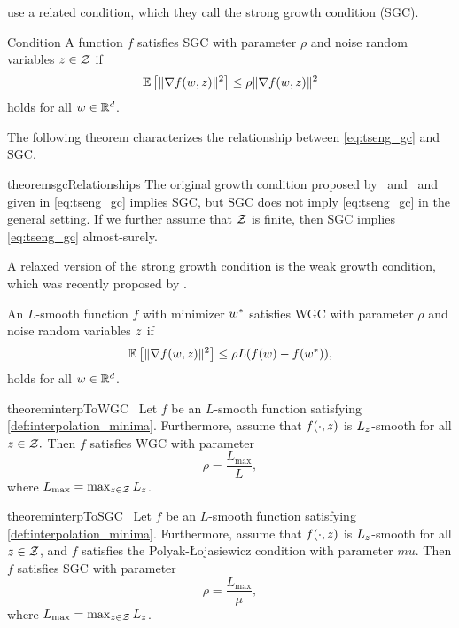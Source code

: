 \citet{vaswani2019fast} use a related condition, which they call the strong growth condition (SGC).
\begin{definition} Condition\label{def:strong_growth}
    A function \(f\) satisfies SGC with parameter \(\rho \) and noise random variables \(z \in \mathcal{Z} \) if
    \[ \mathbb{E}\left[\|\nabla f(w, z)\|^2\right] \leq \rho \|\nabla f(w, z)\|^2 \]
    holds for all \(w \in \mathbb{R}^d\).
\end{definition}

The following theorem characterizes the relationship between \autoref{eq:tseng_gc} and SGC.

\begin{restatable}{theorem}{sgcRelationships}\label{thm:sgc_relationships}
    The original growth condition proposed by~\citet{solodov1998incremental} and~\citet{tseng1998incremental} and given in \autoref{eq:tseng_gc} implies SGC, but
    SGC does not imply \autoref{eq:tseng_gc} in the general setting.
    If we further assume that \( \mathcal{Z} \) is finite, then SGC implies \autoref{eq:tseng_gc} almost-surely.
\end{restatable} 


A relaxed version of the strong growth condition is the weak growth condition, which was recently proposed by \citet{vaswani2019fast}.

\begin{definition}\label{def:weak_growth}
    An \(L\)-smooth function \(f\) with minimizer \(w^* \) satisfies WGC with parameter \(\rho \) and noise random variables \( z \) if
    \[ \mathbb{E}\left[\|\nabla f(w, z)\|^2\right] \leq \rho L (f(w) - f(w^*)), \]
    holds for all \(w \in \mathbb{R}^d\).
\end{definition}


\begin{restatable}{theorem}{interpToWGC}~\label{thm:interp_to_wgc}
    Let \( f \) be an \( L \)-smooth function satisfying \autoref{def:interpolation_minima}.
    Furthermore, assume that \( f(\cdot, z) \) is \( L_z \)-smooth for all \( z \in \mathcal{Z}. \)
    Then \( f \) satisfies WGC with parameter
    \[ \rho = \frac{L_{\text{max}}}{L}, \]
    where \( L_{\text{max}} = \max_{z \in \mathcal{Z}} L_z \).
\end{restatable}


\begin{restatable}{theorem}{interpToSGC}~\label{thm:interp_to_sgc}
    Let \( f \) be an \( L \)-smooth function satisfying \autoref{def:interpolation_minima}.
    Furthermore, assume that \( f(\cdot, z) \) is \( L_z \)-smooth for all \( z \in \mathcal{Z} \),
    and \( f \) satisfies the Polyak-Łojasiewicz condition with parameter \( mu \).
    Then \( f \) satisfies SGC with parameter
    \[ \rho = \frac{L_{\text{max}}}{\mu}, \]
    where \( L_{\text{max}} = \max_{z \in \mathcal{Z}} L_z \).
\end{restatable}
